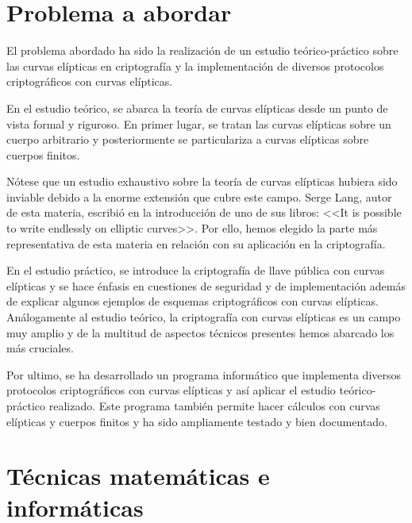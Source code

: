 \section{Problema a abordar}
\label{sub:Problema a abordar}


El problema abordado ha sido la realización de un estudio teórico-práctico sobre las curvas elípticas en criptografía y la implementación de diversos protocolos criptográficos con curvas elípticas.

En el estudio teórico, se abarca la teoría de curvas elípticas desde un punto de vista formal y riguroso. En primer lugar, se tratan las curvas elípticas sobre un cuerpo arbitrario y posteriormente se particulariza a curvas elípticas sobre cuerpos finitos.

Nótese que un estudio exhaustivo sobre la teoría de curvas elípticas hubiera sido inviable debido a la enorme extensión que cubre este campo. Serge Lang, autor de esta materia, escribió en la introducción de uno de sus libros: <<It is possible to write endlessly on elliptic curves>>. Por ello, hemos elegido la parte más representativa de esta materia en relación con su aplicación en la criptografía.

En el estudio práctico, se introduce la criptografía de llave pública con curvas elípticas y se hace énfasis en cuestiones de seguridad y de implementación además de explicar algunos ejemplos de esquemas criptográficos con curvas elípticas. Análogamente al estudio teórico, la criptografía con curvas elípticas es un campo muy amplio y de la multitud de aspectos técnicos presentes hemos abarcado los más cruciales.

Por ultimo, se ha desarrollado un programa informático que implementa diversos protocolos criptográficos con curvas elípticas y así aplicar el estudio teórico-práctico realizado. Este programa también permite hacer cálculos con curvas elípticas y cuerpos finitos y ha sido ampliamente testado y bien documentado.

\section{Técnicas matemáticas e informáticas}
\label{sub:Técnicas matemáticas e informáticas}

